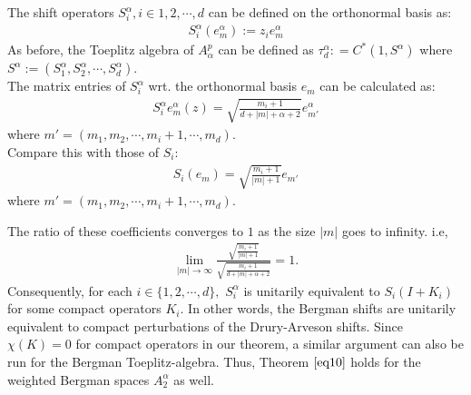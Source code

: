 \documentclass[article]{amsart}
\newtheorem{theorem}            {Theorem}[section]
\newtheorem{remark}{Remark}
\begin{document}
    The shift operators $S^{\alpha}_i, i \in {1,2,\cdots,d}$ can be defined on the orthonormal basis as:
    \begin{align*}
        S^{\alpha}_i(e_m^{\alpha}):= z_i e_m^{\alpha}
    \end{align*}
    As before, the Toeplitz algebra of $A^p_{\alpha}$ can be defined as $\tau^{\alpha}_d : = C^*(1, S^{\alpha})$ where $S^{\alpha}:=(S^{\alpha}_1,S^{\alpha}_2,\cdots,S^{\alpha}_d)$.\\
    
    The matrix entries of $S^{\alpha}_i$ wrt. the orthonormal basis $e_m$ can be calculated as:
\begin{align*}
   S^{\alpha}_i e_m^{\alpha}(z)= \sqrt{\frac{m_i+1}{d+|m|+\alpha+2}} e_{m'}^{\alpha}
   \end{align*}
   where $m'=(m_1,m_2,\cdots,m_{i}+1,\cdots,m_d)$.\\
   Compare this with those of $S_i$:
   \begin{align*}
       S_i(e_m) =  \sqrt{\frac{m_i+1}{|m|+1}} e_{m'}
   \end{align*}
   where $m'=(m_1,m_2,\cdots,m_{i}+1,\cdots,m_d)$.

The ratio of these coefficients converges to $1$ as the size $|m|$ goes to infinity. i.e,
\begin{align*}
    \lim_{|m| \rightarrow \infty} \frac{ \sqrt{\frac{m_i+1}{|m|+1}}} {\sqrt{\frac{m_i+1}{d+|m|+\alpha+2}}} =1.
\end{align*}
Consequently, for each $i\in \{1,2,\cdots,d\},$ $S_i^{\alpha}$ is unitarily equivalent to $S_i(I+K_i)$ for some compact operators $K_i$. In other words, the Bergman shifts are unitarily equivalent to compact perturbations of the Drury-Arveson shifts. Since $\chi(K)=0$ for compact operators in our theorem, a similar argument can also be run for the Bergman Toeplitz-algebra. Thus, Theorem $\ref{eq10}$ holds for the weighted Bergman spaces $A^{\alpha}_2$ as well.
\printbibliography
\end{document}
